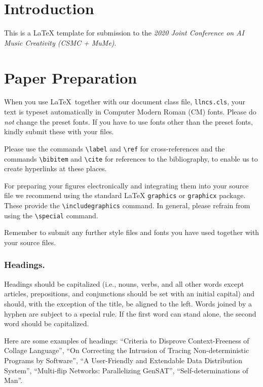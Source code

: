 \documentclass[runningheads,a4paper]{llncs}
\begin{document}
\section{Introduction}

This is a \LaTeX{} template for submission to the \textit{2020 Joint Conference on AI Music Creativity (CSMC + MuMe)}.

\section{Paper Preparation}

When you use \LaTeX\ together with our document class file,
\texttt{llncs.cls},
your text is typeset automatically in Computer Modern Roman (CM) fonts.
Please do
\emph{not} change the preset fonts. If you have to use fonts other
than the preset fonts, kindly submit these with your files.

Please use the commands \verb+\label+ and \verb+\ref+ for
cross-references and the commands \verb+\bibitem+ and \verb+\cite+ for
references to the bibliography, to enable us to create hyperlinks at
these places.

For preparing your figures electronically and integrating them into
your source file we recommend using the standard \LaTeX{} \verb+graphics+ or
\verb+graphicx+ package. These provide the \verb+\includegraphics+ command.
In general, please refrain from using the \verb+\special+ command.

Remember to submit any further style files and
fonts you have used together with your source files.

\subsubsection{Headings.}

Headings should be capitalized
(i.e., nouns, verbs, and all other words
except articles, prepositions, and conjunctions should be set with an
initial capital) and should,
with the exception of the title, be aligned to the left.
Words joined by a hyphen are subject to a special rule. If the first
word can stand alone, the second word should be capitalized.

Here are some examples of headings: ``Criteria to Disprove
Context-Freeness of Collage Language'', ``On Correcting the Intrusion of
Tracing Non-deterministic Programs by Software'', ``A User-Friendly and
Extendable Data Distribution System'', ``Multi-flip Networks:
Parallelizing GenSAT'', ``Self-determinations of Man''.
\end{document}
